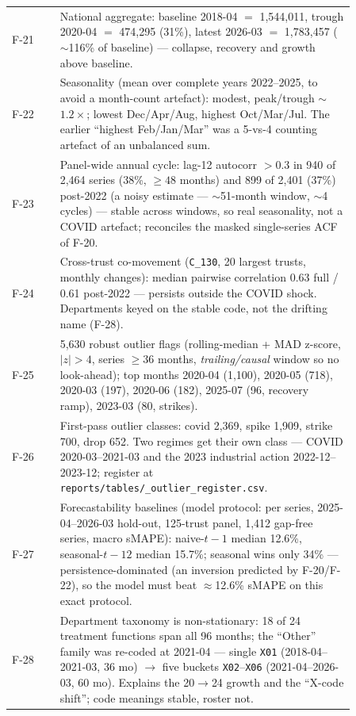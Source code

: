 \documentclass[11pt,a4paper]{article}
\begin{document}
\begin{longtable}{@{}l p{0.86\linewidth}@{}}
F-21 & National aggregate: baseline 2018-04 $=$ 1{,}544{,}011, trough 2020-04 $=$ 474{,}295 (31\%), latest 2026-03 $=$ 1{,}783{,}457 ($\sim$116\% of baseline) --- collapse, recovery and growth above baseline. \\
F-22 & Seasonality (mean over complete years 2022--2025, to avoid a month-count artefact): modest, peak/trough $\sim$$1.2\times$; lowest Dec/Apr/Aug, highest Oct/Mar/Jul. The earlier ``highest Feb/Jan/Mar'' was a 5-vs-4 counting artefact of an unbalanced sum. \\
F-23 & Panel-wide annual cycle: lag-12 autocorr $> 0.3$ in 940 of 2{,}464 series (38\%, $\geq 48$ months) and 899 of 2{,}401 (37\%) post-2022 (a noisy estimate --- $\sim$51-month window, $\sim$4 cycles) --- stable across windows, so real seasonality, not a COVID artefact; reconciles the masked single-series ACF of F-20. \\
F-24 & Cross-trust co-movement (\texttt{C\_130}, 20 largest trusts, monthly changes): median pairwise correlation 0.63 full / 0.61 post-2022 --- persists outside the COVID shock. Departments keyed on the stable code, not the drifting name (F-28). \\
F-25 & 5{,}630 robust outlier flags (rolling-median + MAD z-score, $|z| > 4$, series $\geq 36$ months, \emph{trailing/causal} window so no look-ahead); top months 2020-04 (1{,}100), 2020-05 (718), 2020-03 (197), 2020-06 (182), 2025-07 (96, recovery ramp), 2023-03 (80, strikes). \\
F-26 & First-pass outlier classes: covid 2{,}369, spike 1{,}909, strike 700, drop 652. Two regimes get their own class --- COVID 2020-03--2021-03 and the 2023 industrial action 2022-12--2023-12; register at \texttt{reports/\allowbreak tables/\allowbreak 07\_outlier\_register.csv}. \\
F-27 & Forecastability baselines (model protocol: per series, 2025-04--2026-03 hold-out, 125-trust panel, 1{,}412 gap-free series, macro sMAPE): naive-$t-1$ median 12.6\%, seasonal-$t-12$ median 15.7\%; seasonal wins only 34\% --- persistence-dominated (an inversion predicted by F-20/F-22), so the model must beat $\approx$12.6\% sMAPE on this exact protocol. \\
F-28 & Department taxonomy is non-stationary: 18 of 24 treatment functions span all 96 months; the ``Other'' family was re-coded at 2021-04 --- single \texttt{X01} (2018-04--2021-03, 36 mo) $\rightarrow$ five buckets \texttt{X02}--\texttt{X06} (2021-04--2026-03, 60 mo). Explains the 20$\rightarrow$24 growth and the ``X-code shift''; code meanings stable, roster not. \\
\end{longtable}
\end{document}
